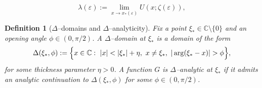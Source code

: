 \documentclass[10pt,a4paper]{amsart}
\newtheorem{definition}{Definition}
\newcommand{\CC}{\mathbb{C}}
\begin{document}
\begin{equation}\label{eq:lambda-def}
	\lambda(\varepsilon)
	:=
	\lim_{x\to x_*(\varepsilon)}
	U(x;\zeta(\varepsilon)),
\end{equation}

\begin{definition}[$\Delta$--domains and $\Delta$--analyticity]\label{def:delta-domain}
	Fix a point $\xi_*\in\CC\setminus\{0\}$ and an opening angle $\phi\in(0,\pi/2)$. A \emph{$\Delta$--domain at $\xi_*$} is a domain
	of the form
	\[
		\Delta(\xi_*,\phi)
		:=
		\Bigl\{x\in\CC:\ |x|<|\xi_*|+\eta,\ x\neq\xi_*,\ |\arg(\xi_*-x)|>\phi\Bigr\},
	\]
	for some thickness parameter $\eta>0$. A function $G$ is \emph{$\Delta$--analytic at $\xi_*$} if it admits an analytic
	continuation to $\Delta(\xi_*,\phi)$ for some $\phi\in(0,\pi/2)$.
\end{definition}
\end{document}
